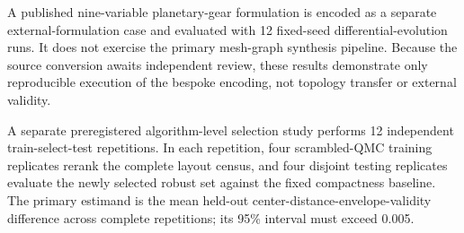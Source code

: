 \documentclass[preprint,12pt]{elsarticle}
\begin{document}
A published nine-variable planetary-gear formulation is encoded as a separate external-formulation case and evaluated with 12 fixed-seed differential-evolution runs. It does not exercise the primary mesh-graph synthesis pipeline. Because the source conversion awaits independent review, these results demonstrate only reproducible execution of the bespoke encoding, not topology transfer or external validity.

A separate preregistered algorithm-level selection study performs 12 independent train-select-test repetitions. In each repetition, four scrambled-QMC training replicates rerank the complete layout census, and four disjoint testing replicates evaluate the newly selected robust set against the fixed compactness baseline. The primary estimand is the mean held-out center-distance-envelope-validity difference across complete repetitions; its 95\% interval must exceed 0.005.
\end{document}
